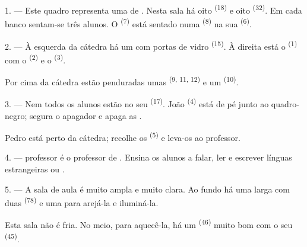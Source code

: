 \VUsaut{2.0mm}
\VUsaut{3.2mm}
\VUsaut{2.6mm}
\VUsaut{3.4mm}
\VUornamento{9pt}
\VUsaut{5.0mm}
\VUsaut{3.0mm}
\VUfilet{16mm}
\VUsaut{5.6mm}

\VUsaut{1.4mm}
\VUsaut{2.2mm}
\VUfilet{20mm}
\VUsaut{6.4mm}

\VUsaut{3.0mm}

1. --- Este quadro representa uma  de .
Nesta sala há oito  \textsuperscript{(18)} e oito 
\textsuperscript{(32)}. Em cada banco sentam-se três alunos. O
 \textsuperscript{(7)} está sentado numa 
\textsuperscript{(8)} na sua  \textsuperscript{(6)}.

2. --- À esquerda da cátedra há um  com portas de vidro
\textsuperscript{(15)}. À direita está o 
\textsuperscript{(1)} com o  \textsuperscript{(2)} e o 
\textsuperscript{(3)}.

Por cima da cátedra estão penduradas umas 
\textsuperscript{(9, 11, 12)} e um  \textsuperscript{(10)}.

3. --- Nem todos os alunos estão no seu  \textsuperscript{(17)}. João
\textsuperscript{(4)} está de pé junto ao quadro-negro; segura o apagador e
apaga as .

Pedro está perto da cátedra; recolhe os 
\textsuperscript{(5)} e leva-os ao professor.

4. ---  professor é o professor de .
Ensina os alunos a falar, ler e escrever línguas estrangeiras
 ou .

5. --- A sala de aula é muito ampla e muito clara. Ao fundo há uma
 larga com duas  \textsuperscript{(78)} e uma
 para arejá-la e iluminá-la.

Esta sala não é fria. No meio, para aquecê-la, há um 
\textsuperscript{(46)} muito bom com o seu  \textsuperscript{(45)}.

